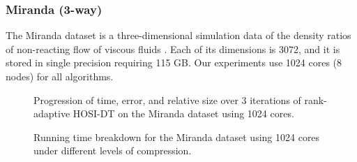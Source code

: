     \subsubsection{Miranda (3-way)}\label{sec:high_nr}
        The Miranda dataset is a three-dimensional simulation data of the
        density ratios of non-reacting flow of viscous fluids \cite{KD+20}. Each
        of its dimensions is 3072, and it is stored in single
        precision requiring 115 GB.
        Our experiments use 1024 cores (8 nodes) for all algorithms.

        \begin{figure}
            \centering
            \renewcommand{\datapath}{data/Miranda/N8_n1024}
            \renewcommand{\thresh}{1e-01,5e-02,1e-02}
            
            \caption[Miranda Dataset - Progression of Time, Trror, and Relative Size]{Progression of time, error, and relative size over 3 iterations of rank-adaptive HOSI-DT on the Miranda dataset using 1024 cores.}
            \label{fig:miranda}
        \end{figure}

        \begin{figure}
            \centering
            \renewcommand{\datapath}{data/Miranda/N8_n1024}
            \renewcommand{\thresh}{1e-01,5e-02,1e-02}
            
            \caption[Miranda Dataset - Running Time Breakdown]{Running time breakdown for the Miranda dataset using 1024 cores under different levels of compression.}
            \label{fig:miranda_breakdown}
        \end{figure}

